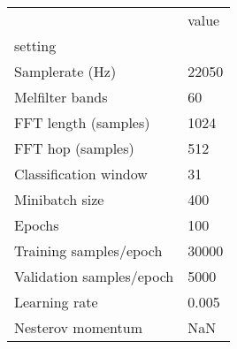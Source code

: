 \begin{tabular}{ll}
\toprule
{} &  value \\
setting                  &        \\
\midrule
Samplerate (Hz)          &  22050 \\
Melfilter bands          &     60 \\
FFT length (samples)     &   1024 \\
FFT hop (samples)        &    512 \\
Classification window    &     31 \\
Minibatch size           &    400 \\
Epochs                   &    100 \\
Training samples/epoch   &  30000 \\
Validation samples/epoch &   5000 \\
Learning rate            &  0.005 \\
Nesterov momentum        &    NaN \\
\bottomrule
\end{tabular}
